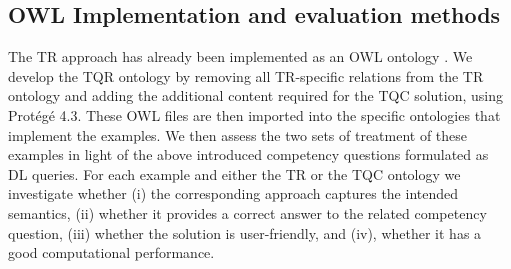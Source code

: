 \begin{itemize}
\subsection*{OWL Implementation and evaluation methods}
The TR approach has already been implemented as an OWL ontology \cite{BFO2:Graz}. We develop the TQR ontology by removing all TR-specific relations 
from the TR ontology and adding 
the additional content required for the TQC solution, using Prot\'eg\'e 4.3. These OWL files are then imported into the specific ontologies that 
implement the examples. We then assess the two sets of treatment of these examples in light of the above introduced competency questions formulated as DL queries. 
For each example and either the TR or the TQC ontology we investigate whether (i) the corresponding approach captures the intended semantics, 
(ii) whether it provides a correct answer to the related competency question, (iii) whether the solution is user-friendly, and (iv), whether it has a good computational performance.   
  
\end{itemize}